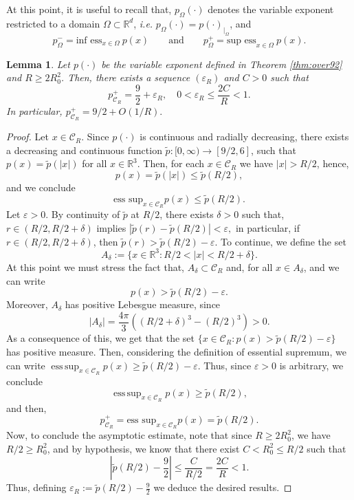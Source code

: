 \documentclass[a4paper,12pt]{amsart}
\theoremstyle{definition}
\theoremstyle{plain}
\newtheorem{lemma}{Lemma}[section]
\let\epsilon\varepsilon
\def\Rt{\mathbb{R}^d}
\begin{document}
At this point,  it is useful to recall that, $p_\Omega(\cdot)$ denotes the variable exponent restricted to a domain $\Omega \subset \Rt$, \emph{i.e.} $p_\Omega(\cdot)=  {p} (\cdot)_ { |_{\Omega} }$, and  
\[
p_{\Omega}^-={\mbox{inf ess}}_{x\in \Omega} \ p(x) \qquad \mbox{and}\qquad p_{\Omega}^+
=
 {\text{sup ess}}_{x\in \Omega} \ p(x)
.
\]
\begin{lemma}\label{lem:PCsup_asymptotics}
Let $p(\cdot)$ be the variable exponent defined in Theorem \ref{thm:over92} and $R\geq 2R_0^2$. 
Then, 
there exists a sequence $(\varepsilon_R)$ and $C>0$ such that
\[
p_{\mathcal{C}_R}^+ = \frac{9}{2} + \varepsilon_R, 
\quad 0<\varepsilon_R \le \frac{2C}{R}<1.
\]
In particular,
$\label{O1R}
p_{\mathcal{C}_R}^+ =  {9}/ {2} + O\!\left( {1} / {R}\right).
$
\end{lemma}
\begin{proof}
Let $x\in \mathcal{C}_R$. 
Since $p(\cdot)$ is continuous and radially decreasing,  
there exists a decreasing and continuous function
$\tilde{p} : [0, \infty) \to [9/2, 6]$, 
such that $ p(x) = \tilde{p}(|x|) $ for all $ x \in \mathbb{R}^3 $.
Then, for each $ x \in \mathcal{C}_R $ we have $|x| > R/2$, hence, 
\[
p(x) = \tilde{p}(|x|) \leq \tilde{p}(R/2) %
,
\]
and we conclude 
\[
\text{ess sup}_{x \in \mathcal{C}_R} p(x) \leq  \tilde{p}(R/2) 
.
\] 
Let $ \epsilon > 0 $. By continuity of $ \tilde{p} $ at $ R/2 $, there exists $ \delta > 0 $ such that, 
$
r \in (R/2, R/2 + \delta) $ implies $|\tilde{p}(r) - \tilde{p}(R/2)| < \epsilon
,
$
in particular,  if
$
r \in (R/2, R/2 + \delta) $, then  $\tilde{p}(r) >\tilde{p}(R/2) - \varepsilon.$
To continue, we define the set
\[
A_\delta := \{x \in \mathbb{R}^3 : R/2 < |x| < R/2 + \delta\}.
\]
At this point we must stress the fact that, $ A_\delta \subset \mathcal{C}_R $ and, for all $ x \in A_\delta $, and we can write
\[
p(x) > \tilde{p}(R/2) - \epsilon.
\]
Moreover, $ A_\delta $ has positive Lebesgue measure, since
\[
| A_\delta | 
=
 \frac{4\pi}{3} ((R/2 + \delta)^3 - (R/2)^3) > 0.
\]
As a consequence of this, we get that the set $
\{x \in \mathcal{C}_R : p(x) > \tilde{p}(R/2) - \varepsilon\}$ has positive measure. Then, considering the definition of essential supremum, we can write $\operatorname{ess\,sup}_{x \in \mathcal{C}_R} p(x) \geq \tilde{p}(R/2) - \epsilon$. Thus, since  $ \varepsilon > 0 $ is arbitrary, we conclude
\[
\operatorname{ess\,sup}_{x \in \mathcal{C}_R} p(x) \geq \tilde{p}(R/2),
\]
and then, 
\[
p_{\mathcal{C}_R}^+ = \text{ess sup}_{x \in \mathcal{C}_R} p(x) =\tilde{p}(R/2).
\]
Now, to conclude  the asymptotic estimate, note that  
since $ R \geq 2R_0^2 $, we have $ R/2 \geq R_0^2 $, and by hypothesis, we know that there exist $C<R^2_0\leq R/2$ such that 
\[
\left| \tilde p(R/2) - \frac{9}{2} \right| \leq \frac{C}{R/2} = \frac{2C}{R}<1.
\]
Thus, defining %
  $\epsilon_R := \tilde p(R/2) - \frac{9}{2}$ 
 we deduce the desired results. 
\end{proof}
\end{document}
